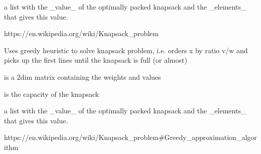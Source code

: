 \documentclass[a4paper]{book}
\begin{document}
%
\begin{Value}
a list with the \_value\_ of the optimally packed knapsack and the \_elements\_ that gives this value.
\end{Value}
%
\begin{References}\relax
https://en.wikipedia.org/wiki/Knapsack\_problem
\end{References}
%
\begin{Description}\relax
Uses greedy heuristic to solve knapsack problem, i.e. orders x by ratio v/w and
picks up the first lines until the knapsack is full (or almost)
\end{Description}
%
\begin{Arguments}
\begin{ldescription}
\item[\code{x}] is a 2dim matrix containing the weights and values

\item[\code{W}] is the capacity of the knapsack
\end{ldescription}
\end{Arguments}
%
\begin{Value}
a list with the \_value\_ of the optimally packed knapsack and the \_elements\_ that gives this value.
\end{Value}
%
\begin{References}\relax
https://en.wikipedia.org/wiki/Knapsack\_problem\#Greedy\_approximation\_algorithm
\end{References}
\printindex{}
\end{document}
